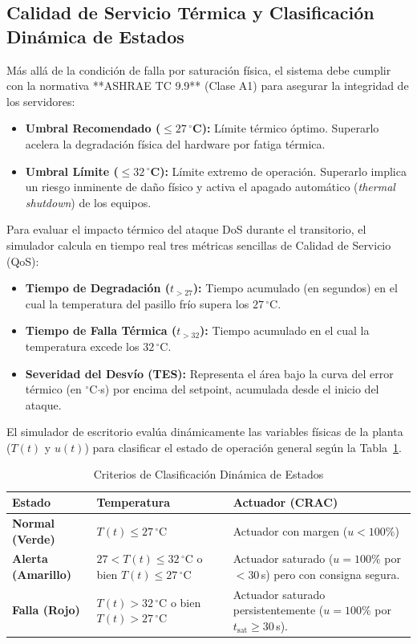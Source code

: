 \documentclass[journal,twocolumn]{IEEEtran}
\begin{document}
\subsection{Calidad de Servicio Térmica y Clasificación Dinámica de Estados}

Más allá de la condición de falla por saturación física, el sistema debe cumplir con la normativa **ASHRAE TC 9.9** (Clase A1) para asegurar la integridad de los servidores:
\begin{itemize}
    \item \textbf{Umbral Recomendado ($\le 27$\,$^\circ$C):} Límite térmico óptimo. Superarlo acelera la degradación física del hardware por fatiga térmica.
    \item \textbf{Umbral Límite ($\le 32$\,$^\circ$C):} Límite extremo de operación. Superarlo implica un riesgo inminente de daño físico y activa el apagado automático (\textit{thermal shutdown}) de los equipos.
\end{itemize}

Para evaluar el impacto térmico del ataque DoS durante el transitorio, el simulador calcula en tiempo real tres métricas sencillas de Calidad de Servicio (QoS):
\begin{itemize}
    \item \textbf{Tiempo de Degradación ($t_{>27}$):} Tiempo acumulado (en segundos) en el cual la temperatura del pasillo frío supera los $27$\,$^\circ$C.
    \item \textbf{Tiempo de Falla Térmica ($t_{>32}$):} Tiempo acumulado en el cual la temperatura excede los $32$\,$^\circ$C.
    \item \textbf{Severidad del Desvío (TES):} Representa el área bajo la curva del error térmico (en $^\circ$C$\cdot$s) por encima del setpoint, acumulada desde el inicio del ataque.
\end{itemize}

El simulador de escritorio evalúa dinámicamente las variables físicas de la planta ($T(t)$ y $u(t)$) para clasificar el estado de operación general según la Tabla~\ref{tab:estados}.

\begin{table}[htbp]
\centering
\caption{Criterios de Clasificación Dinámica de Estados}
\label{tab:estados}
\footnotesize
\begin{tabular}{p{1.4cm} p{2.6cm} p{3.2cm}}
\hline
\textbf{Estado} & \textbf{Temperatura} & \textbf{Actuador (CRAC)} \\ \hline
\textbf{Normal (Verde)}  & $T(t) \le 27$\,$^\circ$C & Actuador con margen ($u < 100\%$) \\ \hline
\textbf{Alerta (Amarillo)} & $27 < T(t) \le 32$\,$^\circ$C o bien $T(t) \le 27$\,$^\circ$C & Actuador saturado ($u = 100\%$ por $<30$\,s) pero con consigna segura. \\ \hline
\textbf{Falla (Rojo)}    & $T(t) > 32$\,$^\circ$C o bien $T(t) > 27$\,$^\circ$C & Actuador saturado persistentemente ($u = 100\%$ por $t_{\text{sat}} \ge 30$\,s). \\ \hline
\end{tabular}
\end{table}
\end{document}
